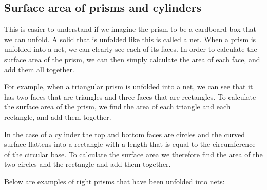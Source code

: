 \subsection{Surface area of prisms and cylinders}


This is easier to understand if we imagine the prism to be a cardboard
box that we can unfold.  A solid that is unfolded like this is called
a net. When a prism is unfolded into a net, we can clearly see each of
its faces. In order to calculate the surface area of the prism, we can
then simply calculate the area of each face, and add them all
together.

\par
For example, when a triangular prism is unfolded into a net, we can
see that it has two faces that are triangles and three faces that are
rectangles. To calculate the surface area of the prism, we find the
area of each triangle and each rectangle, and add them together.

In the case of a cylinder the top and bottom faces are circles and the
curved surface flattens into a rectangle with a length that is equal
to the circumference of the circular base. To calculate the surface
area we therefore find the area of the two circles and the rectangle
and add them together.

\par
{}
Below are examples of right prisms that have been unfolded into nets:


